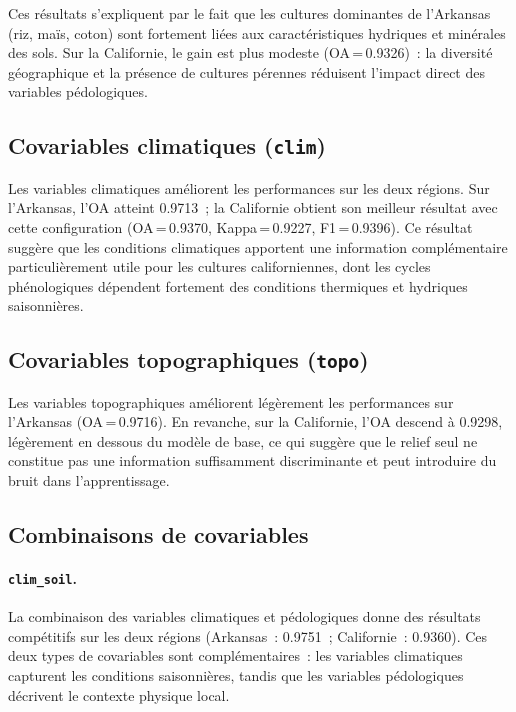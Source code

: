 Ces résultats s'expliquent par le fait que les cultures dominantes de l'Arkansas
(riz, maïs, coton) sont fortement liées aux caractéristiques hydriques et minérales
des sols. Sur la Californie, le gain est plus modeste (OA\,=\,0.9326)~: la diversité
géographique et la présence de cultures pérennes réduisent l'impact direct des
variables pédologiques.

\subsection{Covariables climatiques (\texttt{clim})}

Les variables climatiques améliorent les performances sur les deux régions. Sur
l'Arkansas, l'OA atteint 0.9713~; la Californie obtient son meilleur résultat avec
cette configuration (OA\,=\,0.9370, Kappa\,=\,0.9227, F1\,=\,0.9396). Ce résultat
suggère que les conditions climatiques apportent une information complémentaire
particulièrement utile pour les cultures californiennes, dont les cycles phénologiques
dépendent fortement des conditions thermiques et hydriques saisonnières.

\subsection{Covariables topographiques (\texttt{topo})}

Les variables topographiques améliorent légèrement les performances sur l'Arkansas
(OA\,=\,0.9716). En revanche, sur la Californie, l'OA descend à 0.9298, légèrement
en dessous du modèle de base, ce qui suggère que le relief seul ne constitue pas une
information suffisamment discriminante et peut introduire du bruit dans l'apprentissage.

\subsection{Combinaisons de covariables}

\paragraph{\texttt{clim\_soil}.}
La combinaison des variables climatiques et pédologiques donne des résultats
compétitifs sur les deux régions (Arkansas~: 0.9751~; Californie~: 0.9360). Ces
deux types de covariables sont complémentaires~: les variables climatiques capturent
les conditions saisonnières, tandis que les variables pédologiques décrivent le
contexte physique local.

